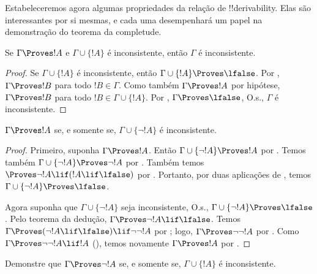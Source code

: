 \documentclass[../../../include/open-logic-section]{subfiles}
\begin{document}
      {}
      {}


Estabeleceremos agora algumas propriedades da relação de
!!{derivability}. Elas são interessantes por si mesmas, e cada uma
desempenhará um papel na demonstração do teorema da completude.

\begin{prop}
  Se $\Gamma \Proves !A$ e $\Gamma \cup \{!A\}$ é inconsistente,
  então $\Gamma$ é inconsistente.
\end{prop}

\begin{proof}
  Se $\Gamma \cup \{!A\}$ é inconsistente, então $\Gamma \cup \{!A\}
  \Proves \lfalse$. Por , $\Gamma \Proves
  !B$ para todo $!B \in \Gamma$. Como também $\Gamma \Proves !A$ por
  hipótese, $\Gamma \Proves !B$ para todo $!B \in \Gamma \cup
  \{!A\}$. Por , $\Gamma \Proves
  \lfalse$, O.s.\@, $\Gamma$ é inconsistente.
\end{proof}

\begin{prop}
$\Gamma \Proves !A$ se, e somente se, $\Gamma \cup \{\lnot !A\}$ é inconsistente.
\end{prop}

\begin{proof}
Primeiro, suponha $\Gamma \Proves !A$. Então $\Gamma \cup \{\lnot !A\}
\Proves !A$ por . Temos também
$\Gamma \cup \{\lnot !A\} \Proves \lnot !A$ por
. Também temos
$\Proves \lnot !A \lif (!A \lif \lfalse)$ por .
Portanto, por duas aplicações de , temos $\Gamma
\cup \{\lnot !A\} \Proves \lfalse$.

Agora suponha que $\Gamma \cup \{\lnot !A\}$ seja inconsistente, O.s.\@,
$\Gamma \cup \{\lnot !A\} \Proves \lfalse$. Pelo teorema da dedução,
$\Gamma \Proves \lnot !A \lif \lfalse$. Temos $\Gamma \Proves (\lnot !A
\lif \lfalse) \lif \lnot\lnot !A$ por ; logo,
$\Gamma \Proves \lnot\lnot !A$ por . Como $\Gamma
\Proves \lnot\lnot !A \lif !A$ (), temos novamente
$\Gamma \Proves !A$ por .
\end{proof}

\begin{prob}
Demonstre que $\Gamma \Proves \lnot !A$ se, e somente se,
$\Gamma \cup \{!A\}$ é inconsistente.
\end{prob}
\end{document}
